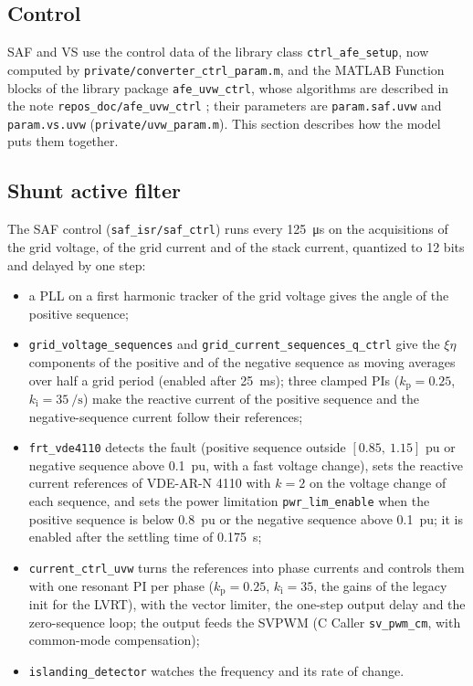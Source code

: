 \documentclass[11pt,a4paper]{scrartcl}
\newcommand{\ped}[1]{_{\mathrm{#1}}}
\newcommand{\code}[1]{\texttt{#1}}
\begin{document}
\begin{onehalfspace}
\section{Control}
\label{sec:control}

SAF and VS use the control data of the library class \code{ctrl\_afe\_setup}, now computed by \code{private/converter\_ctrl\_param.m}, and the MATLAB Function blocks of the library package \code{afe\_uvw\_ctrl}, whose algorithms are described in the note \code{repos\_doc/afe\_uvw\_ctrl} \cite{afe_uvw_note}; their parameters are \code{param.saf.uvw} and \code{param.vs.uvw} (\code{private/uvw\_param.m}). This section describes how the model puts them together.

\subsection{Shunt active filter}
\label{sec:saf}

The SAF control (\code{saf\_isr/saf\_ctrl}) runs every \SI{125}{\micro\second} on the acquisitions of the grid voltage, of the grid current and of the stack current, quantized to 12 bits and delayed by one step:

\begin{itemize}[nosep]
	\item a PLL on a first harmonic tracker of the grid voltage gives the angle of the positive sequence;
	\item \code{grid\_voltage\_sequences} and \code{grid\_current\_sequences\_q\_ctrl} give the $\xi\eta$ components of the positive and of the negative sequence as moving averages over half a grid period (enabled after \SI{25}{ms}); three clamped PIs ($k\ped{p} = 0.25$, $k\ped{i} = \SI{35}{\per\second}$) make the reactive current of the positive sequence and the negative-sequence current follow their references;
	\item \code{frt\_vde4110} detects the fault (positive sequence outside $[0.85,\ 1.15]$ pu or negative sequence above \SI{0.1}{pu}, with a fast voltage change), sets the reactive current references of VDE-AR-N 4110 with $k = 2$ on the voltage change of each sequence, and sets the power limitation \code{pwr\_lim\_enable} when the positive sequence is below \SI{0.8}{pu} or the negative sequence above \SI{0.1}{pu}; it is enabled after the settling time of \SI{0.175}{s};
	\item \code{current\_ctrl\_uvw} turns the references into phase currents and controls them with one resonant PI per phase ($k\ped{p} = 0.25$, $k\ped{i} = 35$, the gains of the legacy init for the LVRT), with the vector limiter, the one-step output delay and the zero-sequence loop; the output feeds the SVPWM (C Caller \code{sv\_pwm\_cm}, with common-mode compensation);
	\item \code{islanding\_detector} watches the frequency and its rate of change.
\end{itemize}


\end{onehalfspace}
\end{document}
